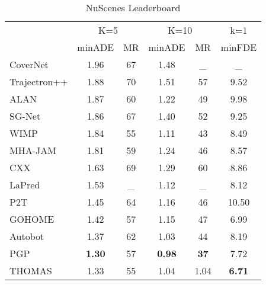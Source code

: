 \documentclass{article} \usepackage{iclr2022_conference,times}
\begin{document}
\begin{table*}[h]
\caption{NuScenes Leaderboard \citep{nuscenesleaderboard}}
    \begin{center}
    \begin{tabular}{l|c c|c c| c}


      \hline
      & \multicolumn{2}{c|}{K=5}  & \multicolumn{2}{c}{K=10} & k=1  \\
      & minADE & MR & minADE  & MR & minFDE \\
      \hline
       CoverNet \citep{phan2020covernet}             & 1.96 & 67 &  1.48  & \_ & \_\\
      Trajectron++ \citep{salzmann2020trajectron++} & 1.88 & 70 &  1.51  & 57 & 9.52\\
      ALAN \citep{narayanan2021divide}              & 1.87 & 60 &  1.22  & 49 & 9.98\\
      SG-Net \citep{wang2021stepwise}               & 1.86 & 67 &  1.40  & 52 & 9.25\\
      WIMP \citep{khandelwal2020if}                 & 1.84 & 55 &  1.11  & 43 & 8.49\\
      MHA-JAM \citep{messaoud2020multi}             & 1.81 & 59 &  1.24  & 46 & 8.57\\
      CXX \citep{luo2020probabilistic}              & 1.63 & 69 &  1.29  & 60 & 8.86\\
      LaPred \citep{kim2021lapred}                  & 1.53 & \_ &  1.12  & \_ & 8.12\\
      P2T \citep{deo2020trajectory}                 & 1.45 & 64 &  1.16  & 46 & 10.50\\
      GOHOME \citep{gilles2021gohome}                & 1.42 & 57 &  1.15 & 47 &  6.99\\
      Autobot \citep{girgis2021autobots}            & 1.37 & 62 &  1.03  & 44 & 8.19\\
      PGP \citep{deo2020trajectory}                 & \textbf{1.30} & 57 &  \textbf{0.98}  & \textbf{37} & 7.72\\
      

      \hline
      THOMAS & 1.33 & 55 & 1.04 & 1.04 & \textbf{6.71} \\
      \hline
    


      
      \hline
    \end{tabular}
    \end{center}
    \label{tab:nuscenes_test}
\end{table*}
\end{document}
